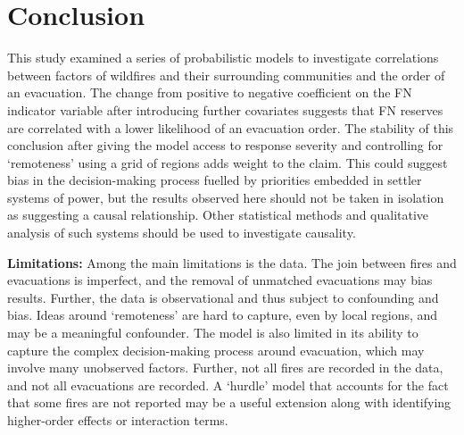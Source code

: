 \section{Conclusion}\label{sec:conclusion}

This study examined a series of probabilistic models to investigate correlations between factors of wildfires and their surrounding communities and the order of an evacuation. The change from positive to negative coefficient on the FN indicator variable after introducing further covariates suggests that FN reserves are correlated with a lower likelihood of an evacuation order. The stability of this conclusion after giving the model access to response severity and controlling for `remoteness' using a grid of regions adds weight to the claim. This could suggest bias in the decision-making process fuelled by priorities embedded in settler systems of power, but the results observed here should not be taken in isolation as suggesting a causal relationship. Other statistical methods and qualitative analysis of such systems should be used to investigate causality.

\textbf{Limitations:} Among the main limitations is the data. The join between fires and evacuations is imperfect, and the removal of unmatched evacuations may bias results. Further, the data is observational and thus subject to confounding and bias. Ideas around `remoteness' are hard to capture, even by local regions, and may be a meaningful confounder. The model is also limited in its ability to capture the complex decision-making process around evacuation, which may involve many unobserved factors. Further, not all fires are recorded in the data, and not all evacuations are recorded. A `hurdle' model that accounts for the fact that some fires are not reported may be a useful extension along with identifying higher-order effects or interaction terms.